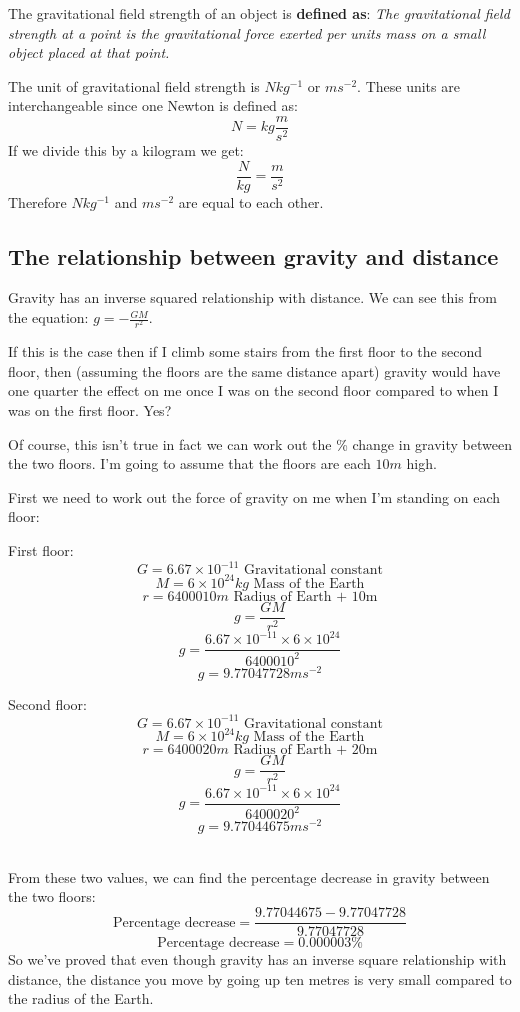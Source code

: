 \documentclass{article}
\begin{document}
The gravitational field strength of an object is \textbf{defined as}: \textit{The gravitational field strength at a point is the gravitational force exerted per units mass on a small object placed at that point.}

The unit of gravitational field strength is $Nkg^{-1}$ or $ms^{-2}$. These units are interchangeable since one Newton is defined as:
\[
	N = kg \frac{m}{s^2}
\] 
If we divide this by a kilogram we get:
\[
	\frac{N}{kg} = \frac{m}{s^2}
\]
Therefore $Nkg^{-1}$ and $ms^{-2}$ are equal to each other.


\subsection*{The relationship between gravity and distance}
Gravity has an inverse squared relationship with distance. We can see this from the equation: $g = -\frac{GM}{r^2}$. 

If this is the case then if I climb some stairs from the first floor to the second floor, then (assuming the floors are the same distance apart) gravity would have one quarter the effect on me once I was on the second floor compared to when I was on the first floor. Yes?

Of course, this isn't true in fact we can work out the \% change in gravity between the two floors. I'm going to assume that the floors are each $10m$ high.

First we need to work out the force of gravity on me when I'm standing on each floor:

\begin{minipage}[t]{0.5\textwidth}
First floor:
\[
	G = 6.67 \times 10^{-11} \textrm{ Gravitational constant}
\]
\[
	M = 6 \times 10^{24}kg \textrm{ Mass of the Earth}
\]
\[
	r = 6400010m \textrm{ Radius of Earth + 10m}
\]
\[
	g = \frac{GM}{r^2}
\]
\[
	g = \frac{6.67 \times 10^{-11} \times 6 × 10^{24}}{6400010^2}
\]
\[
	g = 9.77047728ms^{-2}
\]
\end{minipage}
\begin{minipage}[t]{0.5\textwidth}
Second floor:
\[
	G = 6.67 \times 10^{-11} \textrm{ Gravitational constant}
\]
\[
	M = 6 \times 10^{24}kg \textrm{ Mass of the Earth}
\]
\[
	r = 6400020m \textrm{ Radius of Earth + 20m}
\]
\[
	g = \frac{GM}{r^2}
\]
\[
	g = \frac{6.67 \times 10^{-11} \times 6 \times 10^{24}}{6400020^2}
\]
\[
	g = 9.77044675ms^{-2}
\]
\end{minipage}\\

From these two values, we can find the percentage decrease in gravity between the two floors:
\[
	\textrm{Percentage decrease} = \frac{9.77044675 - 9.77047728}{9.77047728}
\]
\[
	\textrm{Percentage decrease} = 0.000003 \%
\]
So we've proved that even though gravity has an inverse square relationship with distance, the distance you move by going up ten metres is very small compared to the radius of the Earth.
\end{document}
